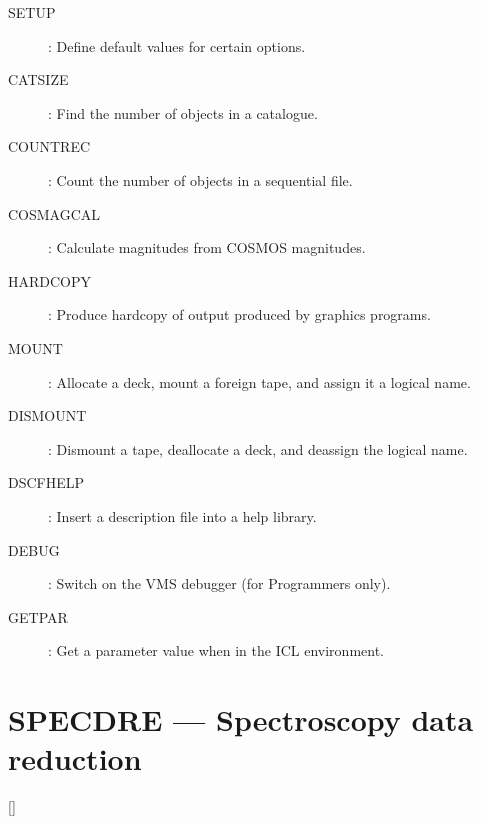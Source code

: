 \begin{description}
\begin{description}
\item [SETUP] : Define default values for certain options.
\item [CATSIZE] : Find the number of objects in a catalogue.
\item [COUNTREC] : Count the number of objects in a sequential file.
\item [COSMAGCAL] : Calculate magnitudes from COSMOS magnitudes.
\item [HARDCOPY] : Produce hardcopy of output produced by graphics programs.
\item [MOUNT] : Allocate a deck, mount a foreign tape, and assign it a
 logical name.
\item [DISMOUNT] : Dismount a tape, deallocate a deck, and deassign the
 logical name.
\item [DSCFHELP] : Insert a description file into a help library.
\item [DEBUG] : Switch on the VMS debugger (for Programmers only).
\item [GETPAR] : Get a parameter value when in the ICL environment.
\end{description}
\end{description}

\newpage

\section{SPECDRE --- Spectroscopy data reduction}

\vspace{-10mm}

\hfill []

\vspace{2mm}

